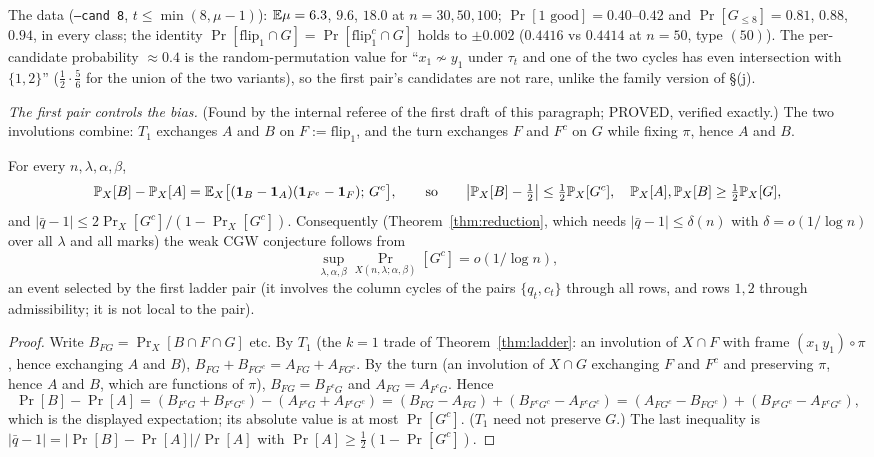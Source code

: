 The data (\texttt{--cand 8}, $t\le\min(8,\mu-1)$): $\mathbb{E}\mu=6.3$, $9.6$,
$18.0$ at $n=30,50,100$; $\Pr[1\text{ good}]=0.40$--$0.42$ and
$\Pr[G_{\le8}]=0.81$, $0.88$, $0.94$, in every class; the
identity $\Pr[\mathrm{flip}_1\cap G]=\Pr[\mathrm{flip}_1^c\cap G]$ holds
to $\pm0.002$ ($0.4416$ vs $0.4414$ at $n=50$, type $(50)$).  The
per-candidate probability $\approx0.4$ is the random-permutation value
for ``$x_1\not\sim y_1$ under $\tau_t$ and one of the two cycles has
even intersection with $\{1,2\}$'' ($\tfrac12\cdot\tfrac56$ for the
union of the two variants), so the first pair's candidates are not rare,
unlike the family version of \S(j).

\emph{The first pair controls the bias.}  (Found by the internal
referee of the first draft of this paragraph; PROVED, verified exactly.)
The two involutions combine: $T_1$ exchanges $A$ and $B$ on $F:=\mathrm{flip}_1$,
and the turn exchanges $F$ and $F^c$ on $G$ while fixing $\pi$, hence $A$
and $B$.

\begin{proposition}\label{prop:firstpairbias}
For every $n,\lambda,\alpha,\beta$,
\[
\mathbb{P}_X[B]-\mathbb{P}_X[A]=\mathbb{E}_X\bigl[(\mathbf 1_B-\mathbf 1_A)(\mathbf 1_{F^c}-\mathbf 1_F);\,G^c\bigr],
\qquad\text{so}\qquad
\bigl|\mathbb{P}_X[B]-\tfrac12\bigr|\le\tfrac12\mathbb{P}_X[G^c],\quad
\mathbb{P}_X[A],\mathbb{P}_X[B]\ge\tfrac12\mathbb{P}_X[G],
\]
and $|\bar q-1|\le 2\Pr_X[G^c]/(1-\Pr_X[G^c])$.  Consequently
(Theorem~\ref{thm:reduction}, which needs $|\bar q-1|\le\delta(n)$ with
$\delta=o(1/\log n)$ over all $\lambda$ and all marks) the weak CGW
conjecture follows from
\begin{equation}\label{eq:hypfirstpair}
\sup_{\lambda,\alpha,\beta}\Pr_{X(n,\lambda;\alpha,\beta)}[G^c]=o(1/\log n),
\end{equation}
an event selected by the first ladder pair (it involves the column
cycles of the pairs $\{q_t,c_t\}$ through all rows, and rows $1,2$
through admissibility; it is not local to the pair).
\end{proposition}

\begin{proof}
Write $B_{FG}=\Pr_X[B\cap F\cap G]$ etc.  By $T_1$ (the $k=1$ trade of
Theorem~\ref{thm:ladder}: an involution of $X\cap F$ with frame
$(x_1\,y_1)\circ\pi$, hence exchanging $A$ and $B$),
$B_{FG}+B_{FG^c}=A_{FG}+A_{FG^c}$.  By the turn (an involution of $X\cap G$
exchanging $F$ and $F^c$ and preserving $\pi$, hence $A$ and $B$, which
are functions of $\pi$), $B_{FG}=B_{F^cG}$ and $A_{FG}=A_{F^cG}$.  Hence
\[
\Pr[B]-\Pr[A]=(B_{F^cG}+B_{F^cG^c})-(A_{F^cG}+A_{F^cG^c})
=(B_{FG}-A_{FG})+(B_{F^cG^c}-A_{F^cG^c})
=(A_{FG^c}-B_{FG^c})+(B_{F^cG^c}-A_{F^cG^c}),
\]
which is the displayed expectation; its absolute value is at most
$\Pr[G^c]$.  ($T_1$ need not preserve $G$.)  The last inequality is
$|\bar q-1|=|\Pr[B]-\Pr[A]|/\Pr[A]$ with $\Pr[A]\ge\tfrac12(1-\Pr[G^c])$.
\end{proof}

